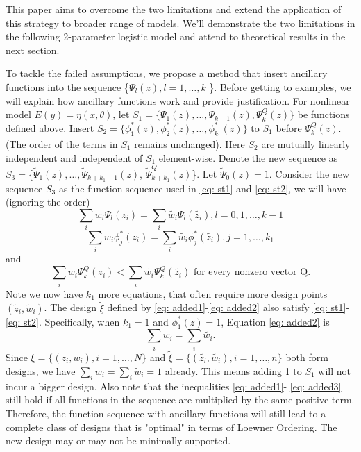 \documentclass[11pt]{amsart}
\theoremstyle{definition}
\theoremstyle{remark}
\begin{document}
This paper aims to overcome the two limitations and extend the application of this strategy to broader range of models. We'll demonstrate the two limitations in the following 2-parameter logistic model and attend to theoretical results in the next section. 

To tackle the failed assumptions, we propose a method that insert ancillary functions into the sequence \{$\Psi_l(z), l=1,\ldots, k$ \}. Before getting to examples, we will explain how ancillary functions work and provide justification. For nonlinear model $E(y) = \eta(x,\theta)$, let $S_1 = \{\Psi_1(z), \ldots,\Psi_{k-1}(z) ,\Psi_k^Q(z)\}$ be functions defined above. Insert $ S_2 =\{\phi^*_1(z), \phi^*_2(z),\ldots, \phi^*_{k_1}(z)\}$ to $S_1$ before  $\Psi_k^Q(z)$. (The order of the terms in $S_1$ remains unchanged). Here $S_2$ are mutually linearly independent and independent of  $S_1$ element-wise. Denote the new sequence as  $S_3 = $\{$\tilde{\Psi}_1(z), \ldots,\tilde{\Psi}_{k+k_1-1}(z)$, $\tilde{\Psi}_{k+k_1}^Q(z)$\}. Let $\tilde{\Psi}_0(z) = 1$. Consider the new sequence $S_3$ as the function sequence used in \eqref{eq: st1} and \eqref{eq: st2}, we will have (ignoring the order) \begin{equation}\label{eq: added1}
\sum_{i}w_i\Psi_l(z_i)=\sum_{i}\tilde{w_i}\Psi_l(\tilde{z_i}), l=0,1,\ldots, k-1    
\end{equation}
\begin{equation}\label{eq: added2}
\sum_{i}w_i\phi_j^*(z_i)=\sum_{i}\tilde{w_i}\phi_j^*(\tilde{z_i}), j=1,\ldots, k_1    
\end{equation}and \begin{equation}\label{eq: added3}
\sum_{i}w_i\Psi_k^Q(z_i)<\sum_{i}\tilde{w_i}\Psi_k^Q(\tilde{z_i}) \text{  for every nonzero vector Q}.
\end{equation} 
Note we now have $k_1$ more equations, that often require more design points $(\tilde{z}_i, \tilde{w}_i)$. The design $\tilde{\xi}$ defined by \eqref{eq: added1}-\eqref{eq: added2} also satisfy \eqref{eq: st1}-\eqref{eq: st2}.  Specifically, when $k_1 = 1$ and $\phi^*_1(z)=1$, Equation \eqref{eq: added2} is \begin{equation}
\sum_{i}w_i=\sum_{i}\tilde{w_i}.  
\end{equation} Since $\xi = \{(z_i,w_i), i=1,\ldots, N\}$ and $\tilde{\xi} = \{(\tilde{z_i},\tilde{w_i}), i=1,\ldots, n\}$ both form designs, we have $\sum_i{w_i} = \sum_i{\tilde{w}_i}=1$ already. This means adding 1 to $S_1$ will not incur a bigger design.
Also note that the inequalities \eqref{eq: added1}- \eqref{eq: added3} still hold if all functions in the sequence are multiplied by the same positive term. 
Therefore, the function sequence with ancillary functions will still lead to a complete class of designs that is "optimal" in terms of Loewner Ordering. The new design may or may not be minimally supported.
\end{document}
